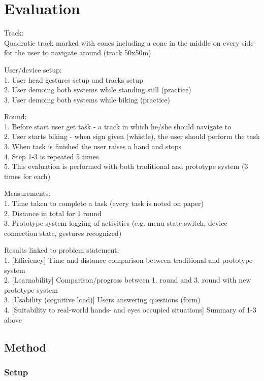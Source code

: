 \chapter{Evaluation}

Track:\\
Quadratic track marked with cones including a cone in the middle on every side for the user to navigate around (track 50x50m)

User/device setup:\\
1. User head gestures setup and tracks setup\\
2. User demoing both systems while standing still (practice)\\
3. User demoing both systems while biking (practice)

Round:\\
1. Before start user get task - a track in which he/she should navigate to\\
2. User starts biking - when sign given (whistle), the user should perform the task\\
3. When task is finished the user raises a hand and stops\\
4. Step 1-3 is repeated 5 times\\
5. This evaluation is performed with both traditional and prototype system (3 times for each)

Measurements:\\
1. Time taken to complete a task (every task is noted on paper)\\
2. Distance in total for 1 round\\
3. Prototype system logging of activities (e.g. menu state switch, device connection state, gestures recognized)

Results linked to problem statement:\\
1. [Efficiency] Time and distance comparison between traditional and prototype system\\
2. [Learnability] Comparison/progress between 1. round and 3. round with new prototype system\\
3. [Usability (cognitive load)] Users answering questions (form)\\
4. [Suitability to real-world hands- and eyes occupied situations] Summary of 1-3 above

\section{Method}

\subsection{Setup}

